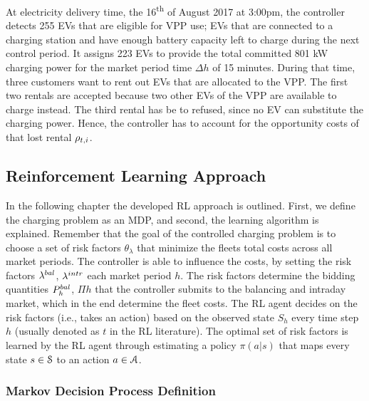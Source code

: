 \documentclass[a4paper, 12pt]{article}
\begin{document}
At electricity delivery time, the 16\textsuperscript{th} of August 2017 at 3:00pm, the
controller detects 255 EVs that are eligible for VPP use; EVs that are connected
to a charging station and have enough battery capacity left to charge during the
next control period. It assigns 223 EVs to provide the total committed 801 kW
charging power for the market period time \(\Delta h\) of 15 minutes. During that
time, three customers want to rent out EVs that are allocated to the VPP. The
first two rentals are accepted because two other EVs of the VPP are available to
charge instead. The third rental has be to refused, since no EV can substitute
the charging power. Hence, the controller has to account for the opportunity
costs of that lost rental \(\oc\).

\subsection{Reinforcement Learning Approach \label{sec-model-rl}}
\label{sec:org97decfc}
In the following chapter the developed RL approach is outlined. First, we define
the charging problem as an MDP, and second, the learning algorithm is explained.
Remember that the goal of the controlled charging problem is to choose a set of
risk factors \(\theta_{\lambda}\) that minimize the fleets total costs across all
market periods. The controller is able to influence the costs, by setting the
risk factors \(\lb{}\), \(\li{}\) each market period \(h\). The risk factors determine
the bidding quantities \(\Pb{h}\), \(\Pi{h}\) that the controller submits to the
balancing and intraday market, which in the end determine the fleet costs. The
RL agent decides on the risk factors (i.e., takes an action) based on the
observed state \(S_{h}\) every time step \(h\) (usually denoted as \(t\) in the RL
literature). The optimal set of risk factors is learned by the RL agent through
estimating a policy \(\pi(a|s)\) that maps every state \(s\in\S\) to an action
\(a\in\A\).
\subsubsection{Markov Decision Process Definition}
\label{sec:orgc1afa7c}
\end{document}
